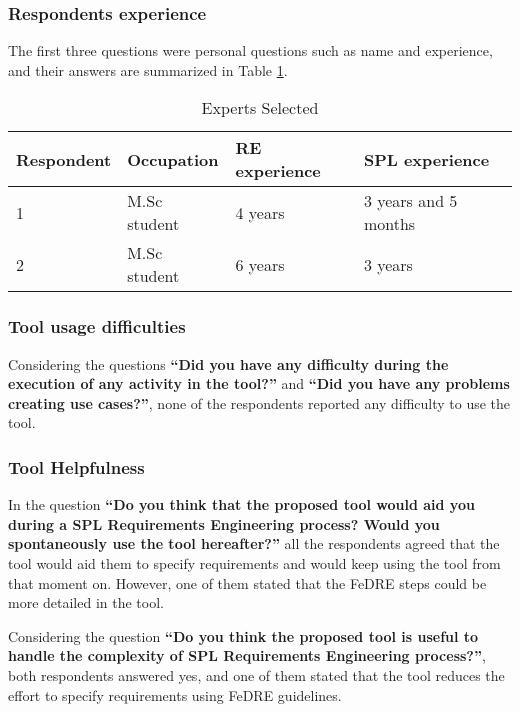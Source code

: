 \subsubsection{Respondents experience}
The first three questions were personal questions such as name and experience,
and their answers are summarized in Table \ref{table:expertsselected}.

\begin{table}
\begin{center}
\centering
\small
\tabcolsep=0.11cm
    \begin{tabular}{|l|l|l|l|}
    \hline
    Respondent & Occupation & RE experience & SPL experience           
    \\ \hline 1 & M.Sc student & 4 years & 3 years and 5 months
    \\ \hline 2 & M.Sc student & 6 years & 3 years 
    \\ \hline
    \end{tabular}
        \caption {Experts Selected}
        \label{table:expertsselected}
        \end{center}

\end{table}

\subsubsection {Tool usage difficulties}
Considering the questions \textbf{“Did you have any difficulty during the
execution of any activity in the tool?”} and  \textbf{“Did you have any problems
creating  use cases?”}, none of the respondents reported any difficulty to use
the tool.

\subsubsection{Tool Helpfulness}
In the question \textbf{“Do you think that the proposed tool would aid you
during a SPL Requirements Engineering process? Would you spontaneously use the
tool hereafter?”} all the respondents agreed that the tool would aid them to specify 
requirements and would keep using the tool 
from that moment on. However, one of them stated that the \ac{FeDRE} steps could
be more detailed in the tool.


Considering the question \textbf{“Do you think the proposed tool is useful to
handle the complexity of SPL Requirements Engineering process?”}, both
respondents answered yes, and one of them stated that the tool reduces the effort to specify 
requirements using \ac{FeDRE} guidelines.


